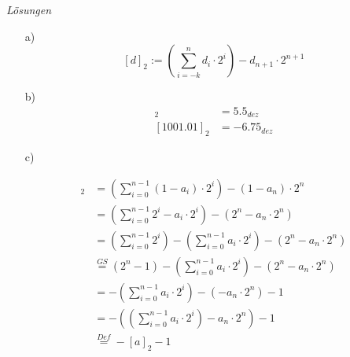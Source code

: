 \documentclass{scrartcl}[11pt]
\begin{document}
\emph{Lösungen}
\begin{itemize}
  \item[a)] $$[d]_2 := \left(\sum_{i=-k}^{n} d_i \cdot 2^i\right) - d_{n+1} \cdot 2^{n+1} $$
  \item[b)] \begin{align*}
    [0101.10]_2 &= 5.5_{dez} \\
    [1001.01]_2 &= -6.75_{dez}
  \end{align*}
  \item[c)]

  \begin{align*}
    [\bar{a}]_2 &= \left(\sum_{i=0}^{n-1} (1-a_i) \cdot 2^i\right) - (1-a_n) \cdot 2^{n}\\
    &= \left(\sum_{i=0}^{n-1}  2^i - a_i \cdot 2^i \right) - (2^n - a_n \cdot 2^n)\\
    &= \left(\sum_{i=0}^{n-1}  2^i\right) - \left(\sum_{i=0}^{n-1}a_i \cdot 2^i \right) - (2^n - a_n \cdot 2^n)\\
    &\overset{GS}{=} (2^n - 1) - \left(\sum_{i=0}^{n-1}a_i \cdot 2^i \right) - (2^n - a_n \cdot 2^n)\\
    &= - \left(\sum_{i=0}^{n-1}a_i \cdot 2^i \right) - (- a_n \cdot 2^n) - 1\\
    &= - \left( \left(\sum_{i=0}^{n-1}a_i \cdot 2^i \right) - a_n \cdot 2^n \right) - 1 \\
    &\overset{Def}{=} -[a]_2 - 1
  \end{align*}

\end{itemize}
\end{document}
